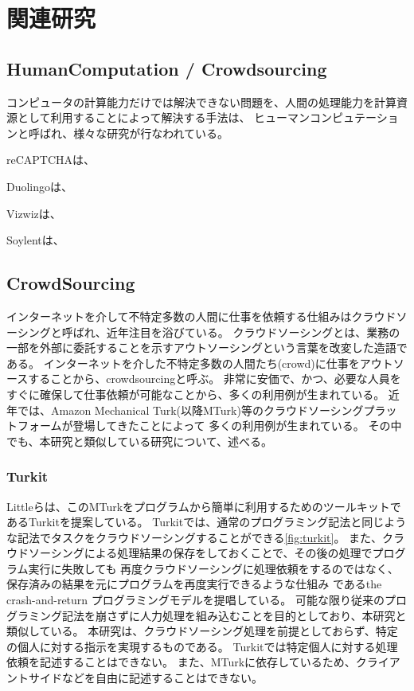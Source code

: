 \chapter{関連研究}
\label{chap:related}

\section{HumanComputation /
Crowdsourcing}\label{humancomputation-crowdsourcing}

コンピュータの計算能力だけでは解決できない問題を、人間の処理能力を計算資源として利用することによって解決する手法は、
ヒューマンコンピュテーション\cite{humancomputation}と呼ばれ、様々な研究が行なわれている。

reCAPTCHA\cite{recaptcha}は、

Duolingo\cite{duolingo}は、

Vizwiz\cite{vizwiz}は、

Soylent\cite{soylent}は、

\section{CrowdSourcing}\label{crowdsourcing}

インターネットを介して不特定多数の人間に仕事を依頼する仕組みはクラウドソーシングと呼ばれ、近年注目を浴びている。
クラウドソーシングとは、業務の一部を外部に委託することを示すアウトソーシングという言葉を改変した造語である\cite{riseofcrowdsourcing}。
インターネットを介した不特定多数の人間たち(crowd)に仕事をアウトソースすることから、crowdsourcingと呼ぶ。
非常に安価で、かつ、必要な人員をすぐに確保して仕事依頼が可能なことから、多くの利用例が生まれている。
近年では、Amazon Mechanical
Turk\cite{amt}(以降MTurk)等のクラウドソーシングプラットフォームが登場してきたことによって
多くの利用例が生まれている。
その中でも、本研究と類似している研究について、述べる。

\subsection{Turkit}\label{turkit}

Littleらは、このMTurkをプログラムから簡単に利用するためのツールキットであるTurkit\cite{turkit}を提案している。
Turkitでは、通常のプログラミング記法と同じような記法でタスクをクラウドソーシングすることができる\ref{fig:turkit}。
また、クラウドソーシングによる処理結果の保存をしておくことで、その後の処理でプログラム実行に失敗しても
再度クラウドソーシングに処理依頼をするのではなく、保存済みの結果を元にプログラムを再度実行できるような仕組み
であるthe crash-and-return プログラミングモデルを提唱している。
可能な限り従来のプログラミング記法を崩さずに人力処理を組み込むことを目的としており、本研究と類似している。
本研究は、クラウドソーシング処理を前提としておらず、特定の個人に対する指示を実現するものである。
Turkitでは特定個人に対する処理依頼を記述することはできない。
また、MTurkに依存しているため、クライアントサイドなどを自由に記述することはできない。

